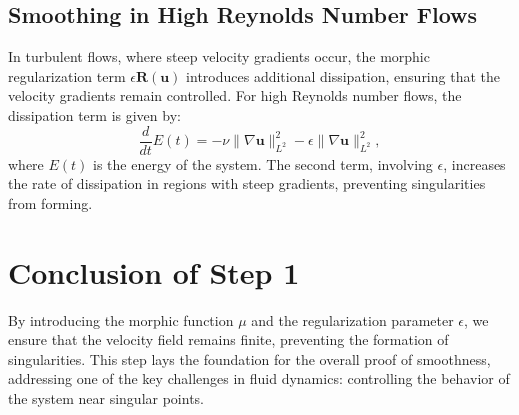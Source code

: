 \documentclass{article}
\begin{document}
\subsection*{Smoothing in High Reynolds Number Flows}

In turbulent flows, where steep velocity gradients occur, the morphic regularization term \( \epsilon \mathbf{R}(\mathbf{u}) \) introduces additional dissipation, ensuring that the velocity gradients remain controlled. For high Reynolds number flows, the dissipation term is given by:
\[
\frac{d}{dt} E(t) = - \nu \|\nabla \mathbf{u}\|_{L^2}^2 - \epsilon \|\nabla \mathbf{u}\|_{L^2}^2,
\]
where \( E(t) \) is the energy of the system. The second term, involving \( \epsilon \), increases the rate of dissipation in regions with steep gradients, preventing singularities from forming.

\section*{Conclusion of Step 1}

By introducing the morphic function \( \mu \) and the regularization parameter \( \epsilon \), we ensure that the velocity field remains finite, preventing the formation of singularities. This step lays the foundation for the overall proof of smoothness, addressing one of the key challenges in fluid dynamics: controlling the behavior of the system near singular points.
\end{document}
